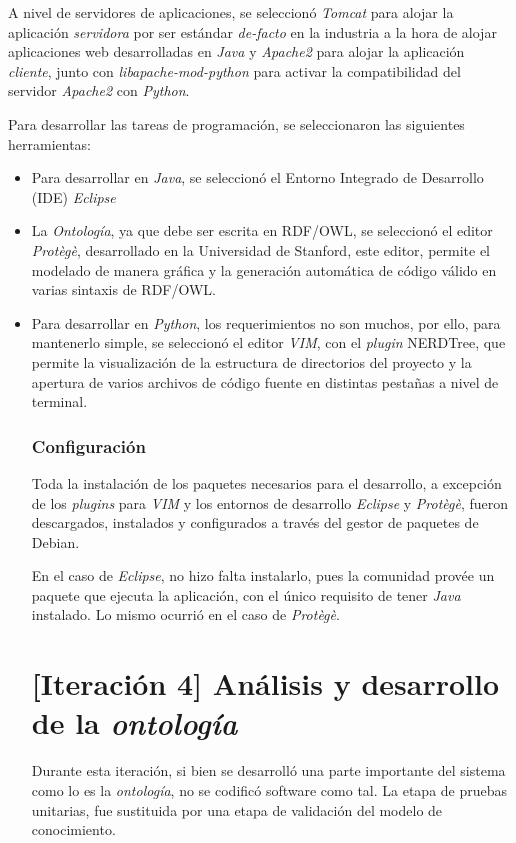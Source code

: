 A nivel de servidores de aplicaciones, se seleccionó \textit{Tomcat} para alojar la aplicación \textit{servidora} por ser estándar \textit{de-facto} en la industria a la hora de alojar aplicaciones web desarrolladas en \textit{Java} y \textit{Apache2} para alojar la aplicación \textit{cliente}, junto con \textit{libapache-mod-python} para activar la compatibilidad del servidor \textit{Apache2} con \textit{Python}.

Para desarrollar las tareas de programación, se seleccionaron las siguientes herramientas:
\begin{itemize}
    \item Para desarrollar en \textit{Java}, se seleccionó el Entorno Integrado de Desarrollo (IDE) \textit{Eclipse}
    \item La \textit{Ontología}, ya que debe ser escrita en RDF/OWL, se seleccionó el editor \textit{Protègè}, desarrollado en la Universidad de Stanford, este editor, permite el modelado de manera gráfica y la generación automática de código válido en varias sintaxis de RDF/OWL.
    \item Para desarrollar en \textit{Python}, los requerimientos no son muchos, por ello, para mantenerlo simple, se seleccionó el editor \textit{VIM}, con el \textit{plugin} NERDTree, que permite la visualización de la estructura de directorios del proyecto y la apertura de varios archivos de código fuente en distintas pestañas a nivel de terminal.

\subsubsection{Configuración}
Toda la instalación de los paquetes necesarios para el desarrollo, a excepción de los \textit{plugins} para \textit{VIM} y los entornos de desarrollo \textit{Eclipse} y \textit{Protègè}, fueron descargados, instalados y configurados a través del gestor de paquetes de Debian.

En el caso de \textit{Eclipse}, no hizo falta instalarlo, pues la comunidad provée un paquete que ejecuta la aplicación, con el único requisito de tener \textit{Java} instalado. Lo mismo ocurrió en el caso de \textit{Protègè}.

\section{[Iteración 4] Análisis y desarrollo de la \textit{ontología}}
Durante esta iteración, si bien se desarrolló una parte importante del sistema como lo es la \textit{ontología}, no se codificó software como tal. La etapa de pruebas unitarias, fue sustituida por una etapa de validación del modelo de conocimiento.


\end{itemize}
